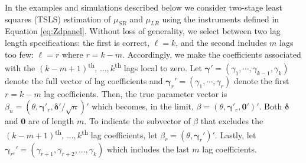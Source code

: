 In the examples and simulations described below we consider two-stage least squares (TSLS) estimation of $\mu_{SR}$ and $\mu_{LR}$ using the instruments defined in Equation \ref{eq:Zdpanel}. 
Without loss of generality, we select between two lag length specifications: the first is correct, $\ell = k$, and the second includes $m$ lags too few: $\ell = r$ where $r = k-m$.
Accordingly, we make the coefficients associated with the $(k-m+1)$\textsuperscript{th}, $\ldots, k$\textsuperscript{th} lags local to zero.
Let $\boldsymbol{\gamma}' = (\gamma_1, \cdots, \gamma_{k-1}, \gamma_{k})$ denote the full vector of lag coefficients and $\boldsymbol{\gamma}_{r}' = (\gamma_1, \cdots, \gamma_{r})$ denote the first $r = k-m$ lag coefficients.
Then, the true parameter vector is $\beta_n = (\theta, \boldsymbol{\gamma}'_{r}, \boldsymbol{\delta}'/\sqrt{n})'$ which becomes, in the limit, $\beta = (\theta, \boldsymbol{\gamma}'_r, \boldsymbol{0}')'$. Both $\boldsymbol{\delta}$ and $\boldsymbol{0}$ are of length $m$. 
To indicate the subvector of $\beta$ that excludes the $(k-m+1)$\textsuperscript{th}, $\ldots, k$\textsuperscript{th} lag coefficients, let $\beta_{r} = (\theta, \boldsymbol{\gamma}_r')'$. Lastly, let $\boldsymbol{\gamma}_{r^c}' = (\gamma_{r+1}, \gamma_{r+2}, \ldots, \gamma_k)$ which includes the last $m$ lag coefficients.

